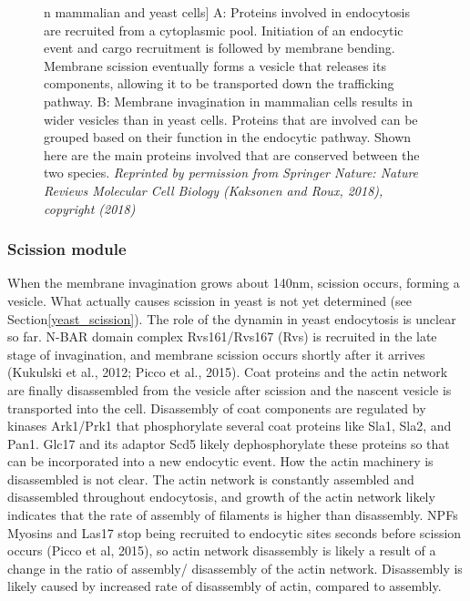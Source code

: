 \begin{figure}[H]
n mammalian and yeast cells]
	{A: Proteins involved in endocytosis are recruited from a cytoplasmic pool. Initiation of an endocytic event and cargo recruitment is followed by membrane bending. Membrane scission eventually forms a vesicle that releases its components, allowing it to be transported down the trafficking pathway. B: Membrane invagination in mammalian cells results in wider vesicles than in yeast cells. Proteins that are involved can be grouped based on their function in the endocytic pathway. Shown here are the main proteins involved that are conserved between the two species. 
		\textit{Reprinted by permission from Springer Nature: Nature Reviews Molecular Cell Biology (Kaksonen and Roux, 2018), copyright (2018)}
		\label{intro_endpathway}}
\end{figure}

\newpage
			\subsubsection{Scission module}
When the membrane invagination grows about 140nm, scission occurs, forming a vesicle. What actually causes scission in yeast is not yet determined (see Section\ref{yeast_scission}).
The role of the dynamin in yeast endocytosis is unclear so far. N-BAR domain complex Rvs161/Rvs167 (Rvs) is recruited in the late stage of invagination, and membrane scission occurs shortly after it arrives (Kukulski et al., 2012; Picco et al., 2015). 
\vspace{5mm}
Coat proteins and the actin network are finally disassembled from the vesicle after scission and the nascent vesicle is transported into the cell. Disassembly of coat components are regulated by kinases Ark1/Prk1 that phosphorylate several coat proteins like Sla1, Sla2, and Pan1. Glc17 and its adaptor Scd5 likely dephosphorylate these proteins so that can be incorporated into a new endocytic event. How the actin machinery is disassembled is not clear. The actin network is constantly assembled and disassembled throughout endocytosis, and growth of the actin network likely indicates that the rate of assembly of filaments is higher than disassembly. NPFs Myosins and Las17 stop being recruited to endocytic sites seconds before scission occurs (Picco et al, 2015), so actin network disassembly is likely a result of a change in the ratio of assembly/ disassembly of the actin network. Disassembly is likely caused by increased rate of disassembly of actin, compared to assembly. 




